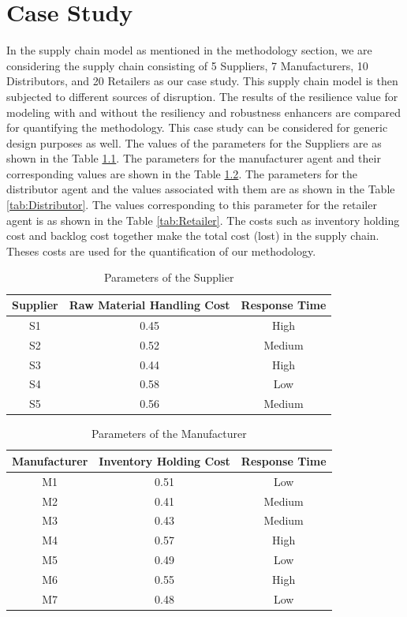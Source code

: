 \chapter{Case Study} \label{ch:casestudy}

In the supply chain model as mentioned in the methodology section, we are considering the supply chain consisting of 5 Suppliers, 7 Manufacturers, 10 Distributors, and 20 Retailers as our case study. This supply chain model is then subjected to different sources of disruption. The results of the resilience value for modeling with and without the resiliency and robustness enhancers are compared for quantifying the methodology. This case study can be considered for generic design purposes as well. The values of the parameters for the Suppliers are as shown in the Table \ref{tab:Supplier}. The parameters for the manufacturer agent and their corresponding values are shown in the Table \ref{tab:Manufacturer}. The parameters for the distributor agent and the values associated with them are as shown in the Table \ref{tab:Distributor}. The values corresponding to this parameter for the retailer agent is as shown in the Table \ref{tab:Retailer}. The costs such as inventory holding cost and backlog cost together make the total cost (lost) in the supply chain. Theses costs are used for the quantification of our methodology.


\begin{table}[H]
\caption{Parameters of the Supplier}
\label{tab:Supplier}
\begin{center}
\begin{tabular}[b]{|c|c|c|}
	\hline
	Supplier & Raw Material Handling Cost & Response Time \\ \hline
	S1 & 0.45 & High\\ \hline
	S2 & 0.52 & Medium \\ \hline
	S3 & 0.44 & High \\ \hline
	S4 & 0.58 & Low \\ \hline
	S5 & 0.56 & Medium \\ \hline
\end{tabular}
\end{center}
\end{table}

\begin{table}[H]
\caption{Parameters of the Manufacturer}
\label{tab:Manufacturer}
\begin{center}
\begin{tabular}[b]{|c|c|c|}
	\hline
	Manufacturer & Inventory Holding Cost & Response Time \\ \hline
	M1 & 0.51 & Low\\ \hline
	M2 & 0.41 & Medium \\ \hline
	M3 & 0.43 & Medium \\ \hline
	M4 & 0.57 & High \\ \hline
	M5 & 0.49 & Low \\ \hline
	M6 & 0.55 & High \\ \hline
	M7 & 0.48 & Low \\ \hline
\end{tabular}
\end{center}
\end{table}

